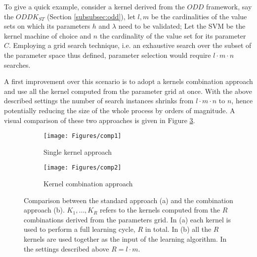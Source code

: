 
To give a quick example, consider a kernel derived from the $ODD$ framework, say
the $ODDK_{ST}$ (Section \ref{subsubsec:odd}), let $l,m$ be the cardinalities of the value sets on which its parameters
$h$ and $\lambda$ need to be validated; Let the SVM be the kernel machine of choice and
$n$ the cardinality of the value set for its parameter $C$.
Employing a grid search technique, i.e. an exhaustive search over the subset
of the parameter space thus defined, parameter selection would require $l\cdot m\cdot n$
searches.

A first improvement over this scenario is to adopt a kernels combination approach
and use all the kernel computed from the parameter grid at once.
With the above described settings the number of search instances
shrinks from $l\cdot m\cdot n$ to $n$, hence potentially reducing the size of the
whole process by orders of magnitude.
A visual comparison of these two approaches is given in Figure \ref{fig:comparison}.

\begin{figure}[h]
    \centering
    \begin{subfigure}{.391\textwidth}
        \centering
        \texttt{[image: Figures/comp1]}
        \caption{Single kernel approach}
        \label{fig:comp1}
    \end{subfigure}\qquad
    \begin{subfigure}{.4\textwidth}
        \centering
        \texttt{[image: Figures/comp2]}
        \caption{Kernel combination approach}
        \label{fig:comp2}
    \end{subfigure}
    \caption{Comparison between the standard approach (a) and the combination approach (b).
    $K_1,\dots,K_R$ refers to the kernels computed from the $R$ combinations
    derived from the parameters grid. In (a) each kernel is used to perform a full learning
    cycle, $R$ in total. In (b) all the $R$ kernels are used together
    as the input of the learning algorithm.
    In the settings described above $R=l\cdot m$.}
    \label{fig:comparison}
\end{figure}


